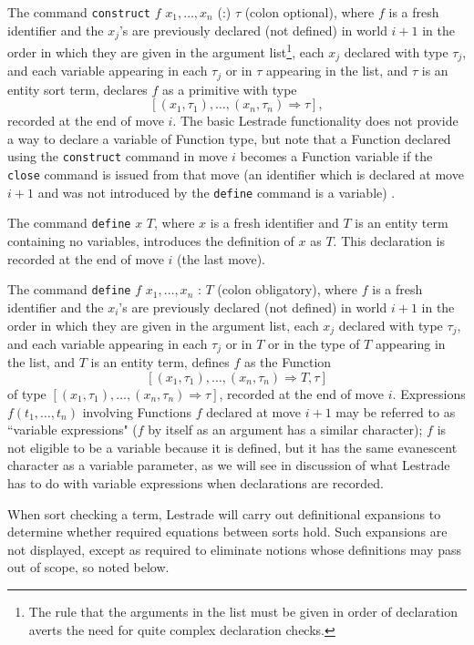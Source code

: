 \documentclass{article}
\begin{document}
The command {\tt construct} $f$ $x_1, \ldots,x_n$ (:) $\tau$ (colon optional), where $f$ is a fresh identifier and the $x_j$'s are previously declared (not defined) in world $i+1$ in the order in which they are given in the argument list\footnote{The rule that the arguments in the list must be given in order of declaration averts the need for quite complex declaration checks.}, each $x_j$ declared with type $\tau_j$, and each variable appearing in each $\tau_j$ or in $\tau$ appearing in the list, and $\tau$ is an entity sort term, declares $f$ as a primitive with type
$$[(x_1,\tau_1),\ldots,(x_n,\tau_n) \Rightarrow \tau],$$ recorded at the end of move $i$.  The basic Lestrade functionality does not provide a way to declare a variable of Function type, but note that a Function declared using the {\tt construct} command in move $i$ becomes a Function variable if the {\tt close} command is issued from that move (an identifier which is declared at move $i+1$ and was not introduced by the {\tt define} command is a variable) .

The command {\tt define} $x$ $T$, where $x$ is a fresh identifier and $T$ is an entity term containing no variables, introduces the definition of $x$ as $T$.  This declaration is recorded at the end of move $i$ (the last move).

The command {\tt define} $f$ $x_1, \ldots,x_n$ : $T$ (colon obligatory), where $f$ is a fresh identifier and the $x_i$'s are previously declared (not defined) in world $i+1$ in the order in which they are given in the argument list, each $x_j$ declared with type $\tau_j$, and each variable appearing in each $\tau_j$ or in $T$ or in the type of $T$ appearing in the list, and $T$ is an entity term, defines $f$ as the Function $$[(x_1,\tau_1),\ldots,(x_n,\tau_n) \Rightarrow T,\tau]$$ of type
$[(x_1,\tau_1),\ldots,(x_n,\tau_n) \Rightarrow \tau]$, recorded at the end of move $i$.    Expressions $f(t_1,\ldots,t_n)$ involving Functions $f$ declared at move $i+1$ may be referred to as ``variable expressions" ($f$ by itself as an argument has  a similar character);  $f$ is not eligible to be a variable because it is defined, but it has the same evanescent character as a variable parameter, as we will see in discussion of what Lestrade has to do with variable expressions when declarations are recorded.

When sort checking a term, Lestrade will carry out definitional expansions to determine whether required equations between sorts hold.  Such expansions are not displayed, except as required to eliminate notions whose definitions may pass out of scope, so noted below.
\end{document}
